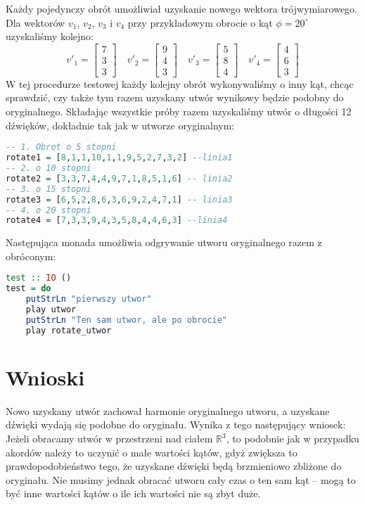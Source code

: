 Każdy pojedynczy obrót umożliwiał uzyskanie nowego wektora trójwymiarowego. Dla wektorów $v_{1}$, $v_{2}$, $v_{3}$ i $v_{4}$ przy przykładowym obrocie o kąt $\phi = 20^{\circ}$ uzyskaliśmy kolejno:
\begin{equation*}
v'_{1} =
\begin{bmatrix}
7 \\
3 \\
3
\end{bmatrix}
\quad
v'_{2} =
\begin{bmatrix}
9 \\
4 \\
3
\end{bmatrix}
\quad
v'_{3} =
\begin{bmatrix}
5 \\
8 \\
4
\end{bmatrix}
\quad
v'_{4} =
\begin{bmatrix}
4 \\
6 \\
3
\end{bmatrix}
\end{equation*}
W tej procedurze testowej każdy kolejny obrót wykonywaliśmy o inny kąt, chcąc sprawdzić, czy także tym razem uzyskany utwór wynikowy będzie podobny do oryginalnego.
Składając wszystkie próby razem uzyskaliśmy utwór o długości 12 dźwięków, dokładnie tak jak w utworze oryginalnym:
\begin{lstlisting}[language = Haskell]
-- 1. Obrot o 5 stopni
rotate1 = [8,1,1,10,1,1,9,5,2,7,3,2] --linia1
-- 2. o 10 stopni
rotate2 = [3,3,7,4,4,9,7,1,8,5,1,6] -- linia2
-- 3. o 15 stopni
rotate3 = [6,5,2,8,6,3,6,9,2,4,7,1] -- linia3
-- 4. o 20 stopni 
rotate4 = [7,3,3,9,4,3,5,8,4,4,6,3] --linia4
\end{lstlisting}

Następująca monada umożliwia odgrywanie utworu oryginalnego razem z obróconym:
\begin{lstlisting}[language = Haskell]
test :: IO ()
test = do
    putStrLn "pierwszy utwor" 
    play utwor
    putStrLn "Ten sam utwor, ale po obrocie"
    play rotate_utwor
\end{lstlisting}


\section{Wnioski}
Nowo uzyskany utwór zachował harmonie oryginalnego utworu, a uzyskane dźwięki wydają się podobne do oryginału. Wynika z tego następujący wniosek: Jeżeli obracamy utwór w przestrzeni nad ciałem $\mathbb{R}^{3}$, to podobnie jak w przypadku akordów należy to uczynić o małe wartości kątów, gdyż zwiększa to prawdopodobieństwo tego, że uzyskane dźwięki będą brzmieniowo zbliżone do oryginału. Nie musimy jednak  obracać utworu cały czas o ten sam kąt -- mogą to być inne wartości kątów o ile ich wartości nie są zbyt duże.